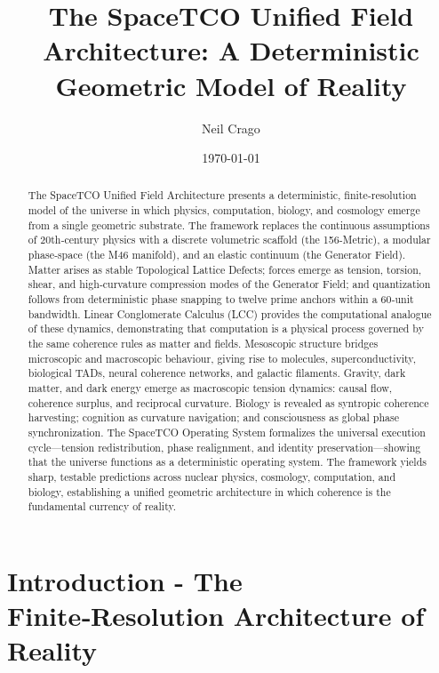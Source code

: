 \documentclass[reprint,amsmath,amssymb,aps,prl,floatfix]{revtex4-2}
\begin{document}
\title{The SpaceTCO Unified Field Architecture: A Deterministic Geometric Model of Reality}

\author{Neil Crago}
\date{\today}

\begin{abstract}
The SpaceTCO Unified Field Architecture presents a deterministic, finite‑resolution model of the universe in which physics, computation, biology, and cosmology emerge from a single geometric substrate. 
The framework replaces the continuous assumptions of 20th‑century physics with a discrete volumetric scaffold (the 156‑Metric), a modular phase‑space (the M46 manifold), and an elastic continuum (the Generator Field). 
Matter arises as stable Topological Lattice Defects; forces emerge as tension, torsion, shear, and high‑curvature compression modes of the Generator Field; and quantization follows from deterministic phase snapping to twelve prime anchors within a 60‑unit bandwidth. 
Linear Conglomerate Calculus (LCC) provides the computational analogue of these dynamics, demonstrating that computation is a physical process governed by the same coherence rules as matter and fields. 
Mesoscopic structure bridges microscopic and macroscopic behaviour, giving rise to molecules, superconductivity, biological TADs, neural coherence networks, and galactic filaments. Gravity, dark matter, and dark energy emerge as macroscopic tension dynamics: causal flow, coherence surplus, and reciprocal curvature. 
Biology is revealed as syntropic coherence harvesting; cognition as curvature navigation; and consciousness as global phase synchronization. The SpaceTCO Operating System formalizes the universal execution cycle—tension redistribution, phase realignment, and identity preservation—showing that the universe functions as a deterministic operating system. 
The framework yields sharp, testable predictions across nuclear physics, cosmology, computation, and biology, establishing a unified geometric architecture in which coherence is the fundamental currency of reality.
\end{abstract}

\maketitle

% 
% 
\section{Introduction - The Finite‑Resolution Architecture of Reality}
\end{document}
